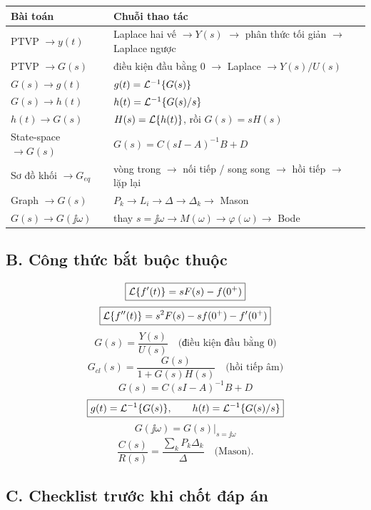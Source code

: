 \begin{center}
\small
\renewcommand{\arraystretch}{1.35}
\begin{tabular}{|p{}|p{}|}
\hline
\textbf{Bài toán} & \textbf{Chuỗi thao tác}\\
\hline
PTVP $\to y(t)$ & Laplace hai vế $\to Y(s)$ $\to$ phân thức tối giản $\to$ Laplace ngược\\
\hline
PTVP $\to G(s)$ & điều kiện đầu bằng $0$ $\to$ Laplace $\to Y(s)/U(s)$\\
\hline
$G(s)\to g(t)$ & $g(t)=\mathcal{L}^{-1}\{G(s)\}$\\
\hline
$G(s)\to h(t)$ & $h(t)=\mathcal{L}^{-1}\{G(s)/s\}$\\
\hline
$h(t)\to G(s)$ & $H(s)=\mathcal{L}\{h(t)\}$, rồi $G(s)=sH(s)$\\
\hline
State-space $\to G(s)$ & $G(s)=C(sI-A)^{-1}B+D$\\
\hline
Sơ đồ khối $\to G_{eq}$ & vòng trong $\to$ nối tiếp / song song $\to$ hồi tiếp $\to$ lặp lại\\
\hline
Graph $\to G(s)$ & $P_k\to L_i\to\Delta\to\Delta_k\to$ Mason\\
\hline
$G(s)\to G(\jj\omega)$ & thay $s=\jj\omega\to M(\omega)\to\varphi(\omega)\to$ Bode\\
\hline
\end{tabular}
\renewcommand{\arraystretch}{1}
\end{center}

\subsection*{B. Công thức bắt buộc thuộc}

\[
\boxed{\mathcal{L}\{f'(t)\}=sF(s)-f(0^+)}
\]
\[
\boxed{\mathcal{L}\{f''(t)\}=s^2F(s)-sf(0^+)-f'(0^+)}
\]
\[
\boxed{G(s)=\frac{Y(s)}{U(s)}\quad\text{(điều kiện đầu bằng 0)}}
\]
\[
\boxed{G_{cl}(s)=\frac{G(s)}{1+G(s)H(s)}\quad\text{(hồi tiếp âm)}}
\]
\[
\boxed{G(s)=C(sI-A)^{-1}B+D}
\]
\[
\boxed{g(t)=\mathcal{L}^{-1}\{G(s)\},
\qquad h(t)=\mathcal{L}^{-1}\{G(s)/s\}}
\]
\[
\boxed{G(\jj\omega)=G(s)\big|_{s=\jj\omega}}
\]
\[
\boxed{
\frac{C(s)}{R(s)}
=
\frac{\sum_kP_k\Delta_k}{\Delta}
\quad\text{(Mason)}.
}
\]

\subsection*{C. Checklist trước khi chốt đáp án}

